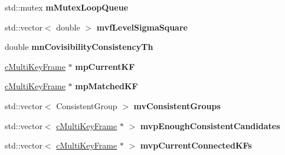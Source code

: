 \begin{DoxyCompactItemize}
\item 
std\+::mutex {\bfseries m\+Mutex\+Loop\+Queue}\hypertarget{classMultiColSLAM_1_1cLoopClosing_a2c0f3b18245445cda7eda5068a739b72}{}\label{classMultiColSLAM_1_1cLoopClosing_a2c0f3b18245445cda7eda5068a739b72}

\item 
std\+::vector$<$ double $>$ {\bfseries mvf\+Level\+Sigma\+Square}\hypertarget{classMultiColSLAM_1_1cLoopClosing_a06f565a9ae0557fb26c75ad48a1649be}{}\label{classMultiColSLAM_1_1cLoopClosing_a06f565a9ae0557fb26c75ad48a1649be}

\item 
double {\bfseries mn\+Covisibility\+Consistency\+Th}\hypertarget{classMultiColSLAM_1_1cLoopClosing_a31517885e314b741bafc419a304b2120}{}\label{classMultiColSLAM_1_1cLoopClosing_a31517885e314b741bafc419a304b2120}

\item 
\hyperlink{classMultiColSLAM_1_1cMultiKeyFrame}{c\+Multi\+Key\+Frame} $\ast$ {\bfseries mp\+Current\+KF}\hypertarget{classMultiColSLAM_1_1cLoopClosing_adfd7b1885f2a9b3329f59b339140ff18}{}\label{classMultiColSLAM_1_1cLoopClosing_adfd7b1885f2a9b3329f59b339140ff18}

\item 
\hyperlink{classMultiColSLAM_1_1cMultiKeyFrame}{c\+Multi\+Key\+Frame} $\ast$ {\bfseries mp\+Matched\+KF}\hypertarget{classMultiColSLAM_1_1cLoopClosing_ae514544e393d600037452cf7ac18ecb3}{}\label{classMultiColSLAM_1_1cLoopClosing_ae514544e393d600037452cf7ac18ecb3}

\item 
std\+::vector$<$ Consistent\+Group $>$ {\bfseries mv\+Consistent\+Groups}\hypertarget{classMultiColSLAM_1_1cLoopClosing_ad84bb0012e845bc00960eeea04620a37}{}\label{classMultiColSLAM_1_1cLoopClosing_ad84bb0012e845bc00960eeea04620a37}

\item 
std\+::vector$<$ \hyperlink{classMultiColSLAM_1_1cMultiKeyFrame}{c\+Multi\+Key\+Frame} $\ast$ $>$ {\bfseries mvp\+Enough\+Consistent\+Candidates}\hypertarget{classMultiColSLAM_1_1cLoopClosing_a519a7e0df6d45d3254c440f09f1595bc}{}\label{classMultiColSLAM_1_1cLoopClosing_a519a7e0df6d45d3254c440f09f1595bc}

\item 
std\+::vector$<$ \hyperlink{classMultiColSLAM_1_1cMultiKeyFrame}{c\+Multi\+Key\+Frame} $\ast$ $>$ {\bfseries mvp\+Current\+Connected\+K\+Fs}\hypertarget{classMultiColSLAM_1_1cLoopClosing_a4c92a4af364a52929089d7705c7d840c}{}\label{classMultiColSLAM_1_1cLoopClosing_a4c92a4af364a52929089d7705c7d840c}


\end{DoxyCompactItemize}
